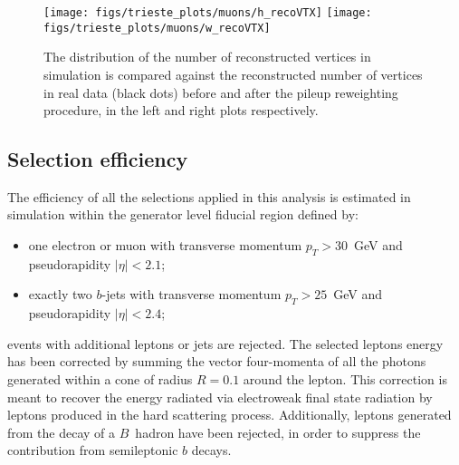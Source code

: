 \begin{figure}[htb]
        \begin{center}
                \leavevmode
                \texttt{[image: figs/trieste\_plots/muons/h\_recoVTX]}
                \texttt{[image: figs/trieste\_plots/muons/w\_recoVTX]}
        \end{center}
        \caption{The distribution of the number of reconstructed vertices in simulation is
          compared against
          the reconstructed number of vertices in real data (black dots) before and
          after the pileup reweighting procedure, in the left and right plots respectively.}
        \label{fig:pileupreweighting}
\end{figure}

\subsection{Selection efficiency}
\label{sec:genlevelEfficiency}

The efficiency of all the selections applied in this analysis
is estimated in simulation within
the generator level fiducial region defined by:
\begin{itemize}
  \item one electron or muon with transverse momentum $p_{T} > 30$~GeV and
    pseudorapidity $|\eta| < 2.1$;
  \item exactly two $b$-jets with transverse momentum $p_{T} > 25$~GeV and
    pseudorapidity $|\eta| < 2.4$;
\end{itemize}
events with additional leptons or jets are rejected.
The selected leptons energy has been corrected by summing
the vector four-momenta of
all the photons generated within a cone of radius $R = 0.1$
around the lepton. This correction is meant to recover the
energy radiated via electroweak final state radiation
by leptons produced in the hard scattering process.
Additionally, leptons generated from the decay of a $B$~hadron have
been rejected, in order to suppress the contribution from
semileptonic $b$ decays.


